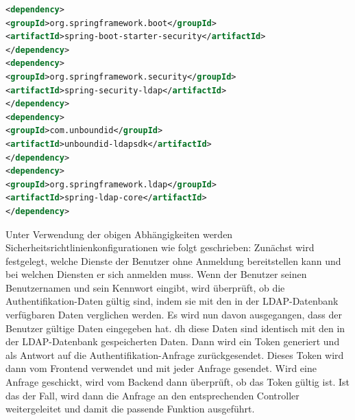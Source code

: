 \documentclass[a4paper,12pt,oneside]{book}
\begin{document}
\begin{lstlisting}[language=XML,caption=pom.xml - security dependencies]
<dependency>
<groupId>org.springframework.boot</groupId>
<artifactId>spring-boot-starter-security</artifactId>
</dependency>
<dependency>
<groupId>org.springframework.security</groupId>
<artifactId>spring-security-ldap</artifactId>
</dependency>
<dependency>
<groupId>com.unboundid</groupId>
<artifactId>unboundid-ldapsdk</artifactId>
</dependency>
<dependency>
<groupId>org.springframework.ldap</groupId>
<artifactId>spring-ldap-core</artifactId>
</dependency>
\end{lstlisting}
Unter Verwendung der obigen Abhängigkeiten werden Sicherheitsrichtlinienkonfigurationen wie folgt geschrieben: Zunächst wird festgelegt, welche Dienste der Benutzer ohne Anmeldung bereitstellen kann und bei welchen Diensten er sich anmelden muss. Wenn der Benutzer seinen Benutzernamen und sein Kennwort eingibt, wird überprüft, ob die Authentifikation-Daten gültig sind, indem sie mit den in der LDAP-Datenbank verfügbaren Daten verglichen werden.
\newline
Es wird nun davon ausgegangen, dass der Benutzer gültige Daten eingegeben hat. dh diese Daten sind identisch mit den in der LDAP-Datenbank gespeicherten Daten. Dann wird ein Token generiert und als Antwort auf die Authentifikation-Anfrage zurückgesendet. Dieses Token wird dann vom Frontend verwendet und mit jeder Anfrage gesendet.
\newline
Wird eine Anfrage geschickt, wird vom Backend dann überprüft, ob das Token gültig ist. Ist das der Fall, wird dann die Anfrage an den entsprechenden Controller weitergeleitet und damit die passende Funktion ausgeführt.
\end{document}
